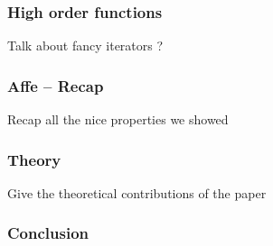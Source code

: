 \documentclass[aspectratio=169,dvipsnames,svgnames,10pt]{beamer}
\begin{document}
\begin{frame}
  \frametitle{High order functions}

  Talk about fancy iterators ?
  
\end{frame}

\begin{frame}
  \frametitle{Affe -- Recap}
  Recap all the nice properties we showed
\end{frame}

\begin{frame}
  \frametitle{Theory}
  Give the theoretical contributions of the paper
\end{frame}

\begin{frame}
  \frametitle{Conclusion}
  
\end{frame}


\end{document}
